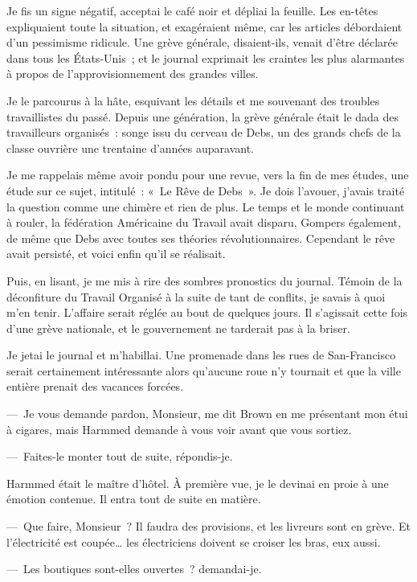 \documentclass[french,twoside]{book} %
\begin{document}
Je fis un signe négatif, acceptai le café noir et dépliai la feuille. Les en-têtes expliquaient toute la situation, et exagéraient même, car les articles débordaient d’un pessimisme ridicule. Une grève générale, disaient-ils, venait d’être déclarée dans tous les États-Unis ; et le journal exprimait les craintes les plus alarmantes à propos de l’approvisionnement des grandes villes.\par
Je le parcourus à la hâte, esquivant les détails et me souvenant des troubles travaillistes du passé. Depuis une génération, la grève générale était le dada des travailleurs organisés : songe issu du cerveau de Debs, un des grands chefs de la classe ouvrière une trentaine d’années auparavant.\par
Je me rappelais même avoir pondu pour une revue, vers la fin de mes études, une étude sur ce sujet, intitulé : « Le Rêve de Debs ». Je dois l’avouer, j’avais traité la question comme une chimère et rien de plus. Le temps et le monde continuant à rouler, la fédération Américaine du Travail avait disparu, Gompers également, de même que Debs avec toutes ses théories révolutionnaires. Cependant le rêve avait persisté, et voici enfin qu’il se réalisait.\par
Puis, en lisant, je me mis à rire des sombres pronostics du journal. Témoin de la déconfiture du Travail Organisé à la suite de tant de conflits, je savais à quoi m’en tenir. L’affaire serait réglée au bout de quelques jours. Il s’agissait cette fois d’une grève nationale, et le gouvernement ne tarderait pas à la briser.\par
Je jetai le journal et m’habillai. Une promenade dans les rues de San-Francisco serait certainement intéressante alors qu’aucune roue n’y tournait et que la ville entière prenait des vacances forcées.\par
— Je vous demande pardon, Monsieur, me dit Brown en me présentant mon étui à cigares, mais Harmmed demande à vous voir avant que vous sortiez.\par
— Faites-le monter tout de suite, répondis-je.\par
Harmmed était le maître d’hôtel. À première vue, je le devinai en proie à une émotion contenue. Il entra tout de suite en matière.\par
— Que faire, Monsieur ? Il faudra des provisions, et les livreurs sont en grève. Et l’électricité est coupée… les électriciens doivent se croiser les bras, eux aussi.\par
— Les boutiques sont-elles ouvertes ? demandai-je.\par
\end{document}
